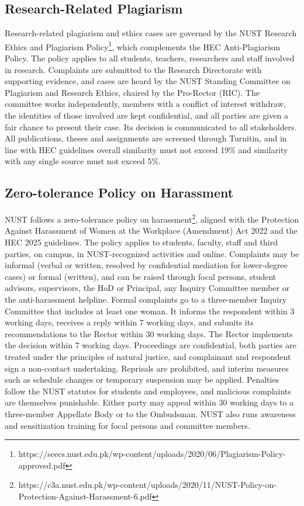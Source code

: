 \subsection{Research-Related Plagiarism}
Research-related plagiarism and ethics cases are governed by the NUST Research Ethics and Plagiarism Policy\footnote{https://seecs.nust.edu.pk/wp-content/uploads/2020/06/Plagiarism-Policy-approved.pdf}, which complements the HEC Anti-Plagiarism Policy. The policy applies to all students, teachers, researchers and staff involved in research. Complaints are submitted to the Research Directorate with supporting evidence, and cases are heard by the NUST Standing Committee on Plagiarism and Research Ethics, chaired by the Pro-Rector (RIC). The committee works independently, members with a conflict of interest withdraw, the identities of those involved are kept confidential, and all parties are given a fair chance to present their case. Its decision is communicated to all stakeholders. All publications, theses and assignments are screened through Turnitin, and in line with HEC guidelines overall similarity must not exceed 19\% and similarity with any single source must not exceed 5\%.
\subsection{Zero-tolerance Policy on Harassment}
NUST follows a zero-tolerance policy on harassment\footnote{https://c3a.nust.edu.pk/wp-content/uploads/2020/11/NUST-Policy-on-Protection-Against-Harassment-6.pdf}, aligned with the Protection Against Harassment of Women at the Workplace (Amendment) Act 2022 and the HEC 2025 guidelines. The policy applies to students, faculty, staff and third parties, on campus, in NUST-recognized activities and online. Complaints may be informal (verbal or written, resolved by confidential mediation for lower-degree cases) or formal (written), and can be raised through focal persons, student advisors, supervisors, the HoD or Principal, any Inquiry Committee member or the anti-harassment helpline. Formal complaints go to a three-member Inquiry Committee that includes at least one woman. It informs the respondent within 3 working days, receives a reply within 7 working days, and submits its recommendations to the Rector within 30 working days. The Rector implements the decision within 7 working days. Proceedings are confidential, both parties are treated under the principles of natural justice, and complainant and respondent sign a non-contact undertaking. Reprisals are prohibited, and interim measures such as schedule changes or temporary suspension may be applied. Penalties follow the NUST statutes for students and employees, and malicious complaints are themselves punishable. Either party may appeal within 30 working days to a three-member Appellate Body or to the Ombudsman. NUST also runs awareness and sensitization training for focal persons and committee members.

